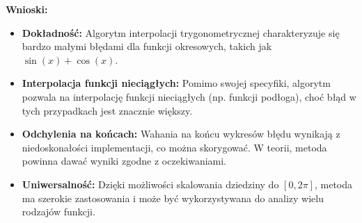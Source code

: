 \textbf{Wnioski:}
\begin{itemize}
    \item \textbf{Dokładność:} Algorytm interpolacji trygonometrycznej charakteryzuje się bardzo małymi błędami dla funkcji okresowych, takich jak \( \sin(x) + \cos(x) \). 
    \item \textbf{Interpolacja funkcji nieciągłych:} Pomimo swojej specyfiki, algorytm pozwala na interpolację funkcji nieciągłych (np. funkcji podłoga), choć błąd w tych przypadkach jest znacznie większy.
    \item \textbf{Odchylenia na końcach:} Wahania na końcu wykresów błędu wynikają z niedoskonałości implementacji, co można skorygować. W teorii, metoda powinna dawać wyniki zgodne z oczekiwaniami.
    \item \textbf{Uniwersalność:} Dzięki możliwości skalowania dziedziny do \( [0, 2\pi] \), metoda ma szerokie zastosowania i może być wykorzystywana do analizy wielu rodzajów funkcji.
\end{itemize}



